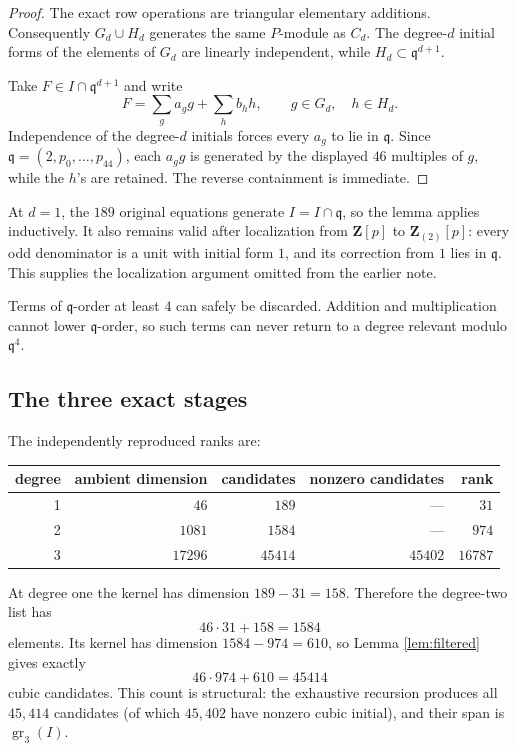 \documentclass[11pt]{article}
\theoremstyle{remark}
\newcommand{\Z}{\mathbf Z}
\newcommand{\gr}{\operatorname{gr}}
\newcommand{\q}{\mathfrak q}
\begin{document}
\begin{proof}
The exact row operations are triangular elementary additions.  Consequently
\(G_d\cup H_d\) generates the same \(P\)-module as \(C_d\).  The degree-\(d\)
initial forms of the elements of \(G_d\) are linearly independent, while
\(H_d\subset\q^{d+1}\).

Take \(F\in I\cap\q^{d+1}\) and write
\[
 F=\sum_g a_g g+\sum_h b_h h,
 \qquad g\in G_d,\quad h\in H_d.
\]
Independence of the degree-\(d\) initials forces every \(a_g\) to lie in
\(\q\).  Since \(\q=(2,p_0,\ldots,p_{44})\), each \(a_g g\) is generated by
the displayed \(46\) multiples of \(g\), while the \(h\)'s are retained.
The reverse containment is immediate.
\end{proof}

At \(d=1\), the \(189\) original equations generate \(I=I\cap\q\), so the
lemma applies inductively.  It also remains valid after localization from
\(\Z[p]\) to \(\Z_{(2)}[p]\): every odd denominator is a unit with initial
form \(1\), and its correction from \(1\) lies in \(\q\).  This supplies the
localization argument omitted from the earlier note.

Terms of \(\q\)-order at least \(4\) can safely be discarded.  Addition and
multiplication cannot lower \(\q\)-order, so such terms can never return to a
degree relevant modulo \(\q^4\).

\subsection{The three exact stages}

The independently reproduced ranks are:
\begin{center}
\begin{tabular}{@{}rrrrr@{}}
\toprule
degree & ambient dimension & candidates & nonzero candidates & rank\\
\midrule
1 & \(46\)    & \(189\)   & ---      & \(31\)\\
2 & \(1081\)  & \(1584\)  & ---      & \(974\)\\
3 & \(17296\) & \(45414\) & \(45402\)& \(16787\)\\
\bottomrule
\end{tabular}
\end{center}

At degree one the kernel has dimension \(189-31=158\).  Therefore the
degree-two list has
\[
  46\cdot31+158=1584
\]
elements.  Its kernel has dimension \(1584-974=610\), so Lemma
\ref{lem:filtered} gives exactly
\[
  46\cdot974+610=45414
\]
cubic candidates.  This count is structural: the exhaustive recursion
produces all \(45{,}414\) candidates (of which \(45{,}402\) have nonzero cubic
initial), and their span is \(\gr_3(I)\).
\end{document}
